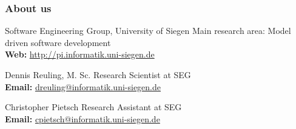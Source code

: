 \begingroup
\makeatletter
{}
\makeatother
\begin{frame}
\frametitle{About us}
\begin{block}{Software Engineering Group, University of Siegen}
Main research area: Model driven software development \\
\medskip
\textbf{Web:} \url{http://pi.informatik.uni-siegen.de}
\end{block}
\begin{block}{Dennis Reuling, M. Sc.}
Research Scientist at SEG\\
\medskip
\textbf{Email:} \url{dreuling@informatik.uni-siegen.de}

\end{block}
\begin{block}{Christopher Pietsch}
Research Assistant at SEG \\
\medskip
\textbf{Email:} \url{cpietsch@informatik.uni-siegen.de}
\end{block}
\end{frame}
\endgroup
